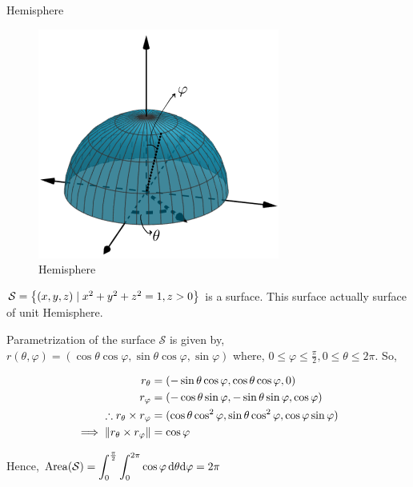 \documentclass[../Analysis-3.tex]{subfiles}
\begin{document}
\begin{Eg}{Hemisphere}{}

  \begin{figure}
    \centering
    \includegraphics[width=.78\linewidth]{../figures/lec-26.2.png}
    \caption{Hemisphere}
  \end{figure}

  $\mathcal{S} = \qty{(x,y,z) \mid x^2+y^2+z^2 = 1, z >0 }$ is a surface. This surface actually surface of unit Hemisphere.

  Parametrization of the surface $\mathcal{S}$ is given by, $r(\theta, \varphi) = (\cos \theta \cos \varphi, \sin \theta \cos \varphi, \sin \varphi)$ where, $0 \le \varphi \le \frac{\pi}{2}, 0 \le \theta \le 2\pi$. So,

  \begin{align*}
    r_{\theta}                                    & = (-\sin \theta \cos \varphi, \cos \theta \cos \varphi, 0)                              \\
    r_{\varphi}                                   & = (-\cos \theta \sin \varphi,-\sin \theta \sin \varphi, \cos \varphi)                   \\
    \therefore r_{\theta} \times r_{\varphi}      & = (\cos \theta \cos ^2 \varphi, \sin \theta \cos ^2\varphi, \cos \varphi  \sin \varphi) \\
    \implies \norm{r_{\theta} \times r_{\varphi}} & = \cos \varphi
  \end{align*}

  Hence, $\displaystyle\operatorname{Area}(\mathcal{S}) = \int_{0}^{\frac{\pi}{2}}\int_{0}^{2\pi} \cos \varphi\, \dd \theta \dd \varphi = 2\pi$

\end{Eg}
\end{document}
